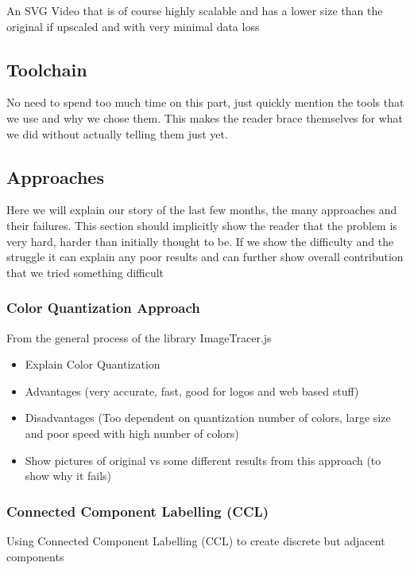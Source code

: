 \documentclass[14pt]{article}
\begin{document}
    An SVG Video that is of course highly scalable and has a lower size than the original if upscaled and with
    very minimal data loss

    \subsection{Toolchain}

    No need to spend too much time on this part, just quickly mention the tools that we use and why we chose them.
    This makes the reader brace themselves for what we did without actually telling them just yet.

    \subsection{Approaches}

    Here we will explain our story of the last few months, the many approaches and their failures. This section
    should implicitly show the reader that the problem is very hard, harder than initially thought to be. If
    we show the difficulty and the struggle it can explain any poor results and can further show overall contribution
    that we tried something difficult

    \subsubsection{Color Quantization Approach}

    From the general process of the library ImageTracer.js

    \begin{itemize}
        \item Explain Color Quantization
        \item Advantages (very accurate, fast, good for logos and web based stuff)
        \item Disadvantages (Too dependent on quantization number of colors, large size and poor speed with high number of colors)
        \item Show pictures of original vs some different results from this approach (to show why it fails)
    \end{itemize}

    \subsubsection{Connected Component Labelling (CCL)}

    Using Connected Component Labelling (CCL) to create discrete but adjacent components
\end{document}
